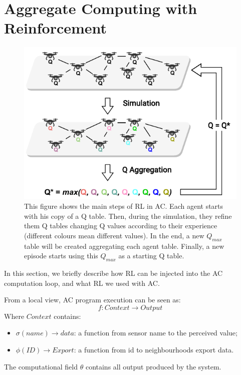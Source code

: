 \documentclass[conference]{IEEEtran}
\begin{document}
\section{Aggregate Computing with Reinforcement}\label{aggregate-and-rl}
\begin{figure}
  \centering
  \includegraphics[width=\linewidth]{img/algorithm-learning.pdf}
  \caption{This figure shows the main steps of RL in AC.
  Each agent starts with his copy of a Q table. 
  Then, during the simulation, they refine them Q tables changing Q values according to their experience (different colours mean different values). 
  In the end, a new $Q_{max}$ table will be created aggregating each agent table. 
  Finally, a new episode starts using this $Q_{max}$ as a starting Q table.
  }
  \label{fig:aggregate-q-learning}
\end{figure}
% 
In this section, we briefly describe how RL can be injected into the AC computation loop,
 and what RL we used with AC.

From a local view, AC program execution can be seen as:
$$
f : \textit{Context} \rightarrow \textit{Output}
$$
Where $\textit{Context}$ contains:
\begin{itemize}
  \item $\sigma(name) \rightarrow \textit{data}$: a function from sensor name to the perceived value;
  \item $\phi(\textit{ID}) \rightarrow \textit{Export}$: a function from id to neighbourhoods export data.
\end{itemize}
The computational field $\theta$ contains all output produced by the system.
\end{document}
